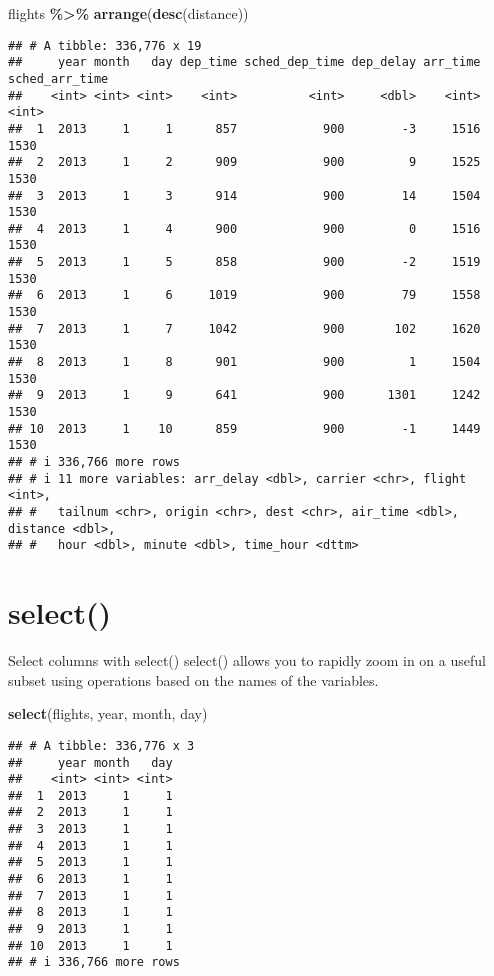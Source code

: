 \documentclass[
]{article}
\newenvironment{Shaded}{\begin{snugshade}}{\end{snugshade}}
\newcommand{\FunctionTok}[1]{\textcolor[rgb]{0.13,0.29,0.53}{\textbf{#1}}}
\newcommand{\NormalTok}[1]{#1}
\newcommand{\SpecialCharTok}[1]{\textcolor[rgb]{0.81,0.36,0.00}{\textbf{#1}}}
\begin{document}
\begin{Shaded}
\begin{Highlighting}[]
\NormalTok{flights }\SpecialCharTok{\%\textgreater{}\%} 
    \FunctionTok{arrange}\NormalTok{(}\FunctionTok{desc}\NormalTok{(distance))}
\end{Highlighting}
\end{Shaded}

\begin{verbatim}
## # A tibble: 336,776 x 19
##     year month   day dep_time sched_dep_time dep_delay arr_time sched_arr_time
##    <int> <int> <int>    <int>          <int>     <dbl>    <int>          <int>
##  1  2013     1     1      857            900        -3     1516           1530
##  2  2013     1     2      909            900         9     1525           1530
##  3  2013     1     3      914            900        14     1504           1530
##  4  2013     1     4      900            900         0     1516           1530
##  5  2013     1     5      858            900        -2     1519           1530
##  6  2013     1     6     1019            900        79     1558           1530
##  7  2013     1     7     1042            900       102     1620           1530
##  8  2013     1     8      901            900         1     1504           1530
##  9  2013     1     9      641            900      1301     1242           1530
## 10  2013     1    10      859            900        -1     1449           1530
## # i 336,766 more rows
## # i 11 more variables: arr_delay <dbl>, carrier <chr>, flight <int>,
## #   tailnum <chr>, origin <chr>, dest <chr>, air_time <dbl>, distance <dbl>,
## #   hour <dbl>, minute <dbl>, time_hour <dttm>
\end{verbatim}

\hypertarget{select}{%
\section{select()}\label{select}}

Select columns with select() select() allows you to rapidly zoom in on a
useful subset using operations based on the names of the variables.

\begin{Shaded}
\begin{Highlighting}[]
\FunctionTok{select}\NormalTok{(flights, year, month, day)}
\end{Highlighting}
\end{Shaded}

\begin{verbatim}
## # A tibble: 336,776 x 3
##     year month   day
##    <int> <int> <int>
##  1  2013     1     1
##  2  2013     1     1
##  3  2013     1     1
##  4  2013     1     1
##  5  2013     1     1
##  6  2013     1     1
##  7  2013     1     1
##  8  2013     1     1
##  9  2013     1     1
## 10  2013     1     1
## # i 336,766 more rows
\end{verbatim}
\end{document}
